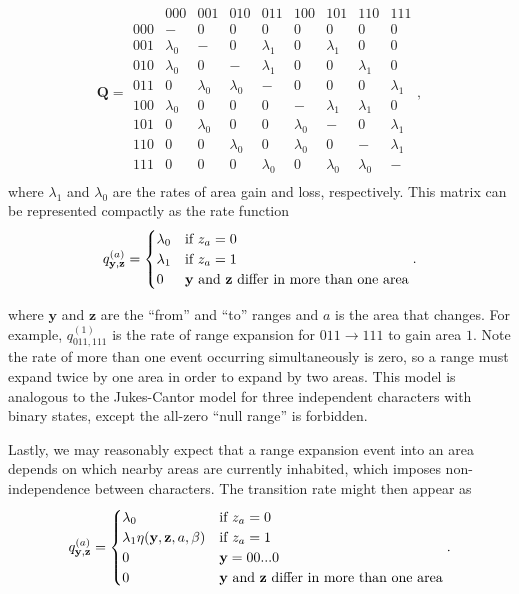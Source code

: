 \documentclass[11pt]{article}
\begin{document}
\[
\textbf{Q} = 
	\begin{array}{r|cccccccc}
		& 000 & 001 & 010 & 011 & 100 & 101 & 110 & 111 \\
		\hline
		000 & - & 0 & 0 & 0 & 0 & 0 & 0 & 0 \\
		001 & \lambda_0 & - & 0 & \lambda_1 & 0 & \lambda_1 & 0 & 0 \\
		010 & \lambda_0 & 0 & - & \lambda_1 & 0 & 0 & \lambda_1 & 0 \\
		011 & 0 & \lambda_0 & \lambda_0 & - & 0 & 0 & 0 & \lambda_1 \\
		100 & \lambda_0 & 0 & 0 & 0 & - & \lambda_1 & \lambda_1 & 0 \\
		101 & 0 & \lambda_0 & 0 & 0 & \lambda_0 & - & 0 & \lambda_1 \\
		110 & 0 & 0 & \lambda_0 & 0 & \lambda_0 & 0 & - & \lambda_1 \\
		111 & 0 & 0 & 0 & \lambda_0 & 0 & \lambda_0 & \lambda_0 & - \\								
	\end{array},
\]
where $\lambda_1$ and $\lambda_0$ are the rates of area gain and loss, respectively.
This matrix can be represented compactly as the rate function
\[
q^{(a)}_{\textbf{y},\textbf{z}} =
\begin{cases}
\lambda_0 & \text{if $z_a=0$}  \\
\lambda_1 & \text{if $z_a=1$} \\
0 & \text{\textbf{y} and \textbf{z} differ in more than one area}
\end{cases}.
\]

where $\textbf{y}$ and $\textbf{z}$ are the ``from'' and ``to'' ranges and $a$ is the area that changes.
For example, $q^{(1)}_{011,111}$ is the rate of range expansion for $011 \rightarrow 111$ to gain area $1$.
Note the rate of more than one event occurring simultaneously is zero, so a range must expand twice by one area in order to expand by two areas.
This model is analogous to the Jukes-Cantor model for three independent characters with binary states, except the all-zero ``null range'' is forbidden.

Lastly, we may reasonably expect that a range expansion event into an area depends on which nearby areas are currently inhabited, which imposes non-independence between characters.
The transition rate might then appear as
\[
q^{(a)}_{\textbf{y},\textbf{z}} =
\begin{cases}
\lambda_0 & \text{if $z_a=0$}  \\
\lambda_1 \eta(\textbf{y}, \textbf{z}, a, \beta) & \text{if $z_a=1$} \\
0 & \mathbf{y} = 00...0 \\
0 & \text{\textbf{y} and \textbf{z} differ in more than one area}
\end{cases}.
\]
\end{document}
